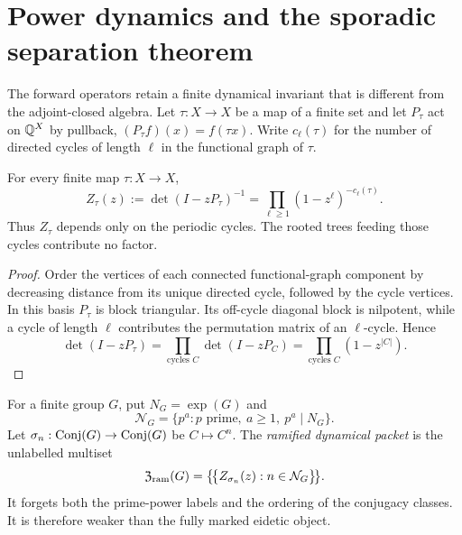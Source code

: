 \section{Power dynamics and the sporadic separation theorem}
\label{sec:power-dynamics}

The forward operators retain a finite dynamical invariant that is different
from the adjoint-closed algebra.  Let \(\tau:X\to X\) be a map of a finite
set and let \(P_\tau\) act on \(\mathbb Q^X\) by pullback,
\((P_\tau f)(x)=f(\tau x)\).  Write \(c_\ell(\tau)\) for the number of
directed cycles of length \(\ell\) in the functional graph of \(\tau\).

\begin{theorem}
\label{thm:finite-map-zeta}
For every finite map \(\tau:X\to X\),
\begin{equation}
 Z_\tau(z):=\det(I-zP_\tau)^{-1}
 =\prod_{\ell\geq1}(1-z^\ell)^{-c_\ell(\tau)}.
 \label{eq:finite-map-zeta}
\end{equation}
Thus \(Z_\tau\) depends only on the periodic cycles.  The rooted trees
feeding those cycles contribute no factor.
\end{theorem}

\begin{proof}
Order the vertices of each connected functional-graph component by
decreasing distance from its unique directed cycle, followed by the cycle
vertices.  In this basis \(P_\tau\) is block triangular.  Its off-cycle
diagonal block is nilpotent, while a cycle of length \(\ell\) contributes
the permutation matrix of an \(\ell\)-cycle.  Hence
\[
 \det(I-zP_\tau)
 =\prod_{\text{cycles }C}\det(I-zP_C)
 =\prod_{\text{cycles }C}(1-z^{|C|}).
\]
\end{proof}

For a finite group \(G\), put \(N_G=\exp(G)\) and
\[
 \mathcal N_G=\{p^a:p\text{ prime},\ a\geq1,\ p^a\mid N_G\}.
\]
Let \(\sigma_n:\operatorname{Conj}(G)\to\operatorname{Conj}(G)\) be \(C\mapsto C^n\).  The
\emph{ramified dynamical packet} is the unlabelled multiset
\begin{equation}
 \mathfrak Z_{\rm ram}(G)
 =\bigl\{\!\bigl\{Z_{\sigma_n}(z):n\in\mathcal N_G\bigr\}\!\bigr\}.
 \label{eq:ramified-dynamical-packet}
\end{equation}
It forgets both the prime-power labels and the ordering of the conjugacy
classes.  It is therefore weaker than the fully marked eidetic object.

